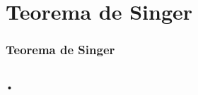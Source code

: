 \section{Teorema de Singer}


\begin{frame}
\vspace{5pt}
\frametitle{Teorema de Singer}
\begin{columns}
\column{\dimexpr\paperwidth-15pt}

•

\end{columns}
\end{frame}
